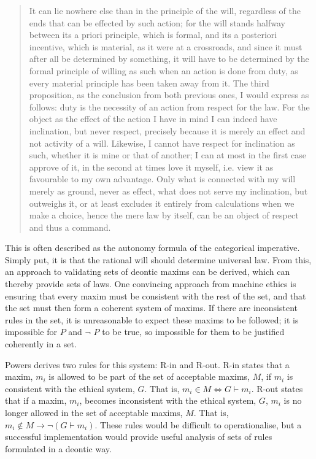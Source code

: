 \documentclass{l4proj}
\begin{document}
\blockquote{It can lie nowhere else than in the principle of the will, regardless of the ends that can be effected by such action; for the will stands halfway between its a priori principle, which is formal, and its a posteriori incentive, which is material, as it were at a crossroads, and since it must after all be determined by something, it will have to be determined by the formal principle of willing as such when an action is done from duty, as every material principle has been taken away from it. The third proposition, as the conclusion from both previous ones, I would express as follows: duty is the necessity of an action from respect for the law. For the object as the effect of the action I have in mind I can indeed have inclination, but never respect, precisely because it is merely an effect and not activity of a will. Likewise, I cannot have respect for inclination as such, whether it is mine or that of another; I can at most in the first case approve of it, in the second at times love it myself, i.e. view it as favourable to my own advantage. Only what is connected with my will merely as ground, never as effect, what does not serve my inclination, but outweighs it, or at least excludes it entirely from calculations when we make a choice, hence the mere law by itself, can be an object of respect and thus a command.}

This is often described as the autonomy formula of the categorical imperative. Simply put, it is that the rational will should determine universal law. From this, an approach to validating sets of deontic maxims can be derived, which can thereby provide sets of laws. One convincing approach from machine ethics is ensuring that every maxim must be consistent with the rest of the set, and that the set must then form a coherent system of maxims\cite{Powers}. If there are inconsistent rules in the set, it is unreasonable to expect these maxims to be followed; it is impossible for $P$ and \( \neg \) $P$ to be true, so impossible for them to be justified coherently in a set. 

Powers derives two rules for this system: R-in and R-out. R-in states that a maxim, $m_i$ is allowed to be part of the set of acceptable maxims, $M$, if $m_i$ is consistent with the ethical system, $G$. That is, $m_i \in M \iff G \vdash m_i $. R-out states that if a maxim, $m_i$, becomes inconsistent with the ethical system, $G$, $m_i$ is no longer allowed in the set of acceptable maxims, $M$. That is, $m_i \notin M \rightarrow \neg(G \vdash m_i)$. These rules would be difficult to operationalise, but a successful implementation would provide useful analysis of sets of rules formulated in a deontic way. 
\end{document}
